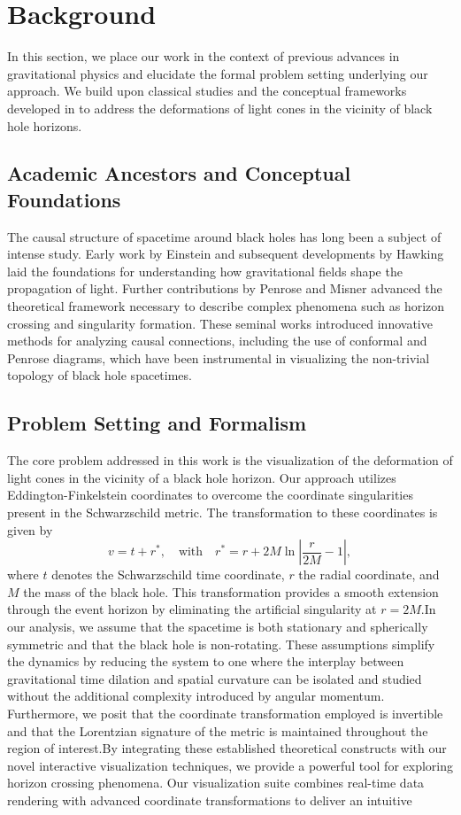 \documentclass{article}
\begin{document}
\section{Background}In this section, we place our work in the context of previous advances in gravitational physics and elucidate the formal problem setting underlying our approach. We build upon classical studies and the conceptual frameworks developed in \cite{Einstein1916, Hawking1973, Penrose1965, Misner1973} to address the deformations of light cones in the vicinity of black hole horizons.\subsection{Academic Ancestors and Conceptual Foundations}The causal structure of spacetime around black holes has long been a subject of intense study. Early work by Einstein \cite{Einstein1916} and subsequent developments by Hawking \cite{Hawking1973} laid the foundations for understanding how gravitational fields shape the propagation of light. Further contributions by Penrose \cite{Penrose1965} and Misner \cite{Misner1973} advanced the theoretical framework necessary to describe complex phenomena such as horizon crossing and singularity formation. These seminal works introduced innovative methods for analyzing causal connections, including the use of conformal and Penrose diagrams, which have been instrumental in visualizing the non-trivial topology of black hole spacetimes.\subsection{Problem Setting and Formalism}The core problem addressed in this work is the visualization of the deformation of light cones in the vicinity of a black hole horizon. Our approach utilizes Eddington-Finkelstein coordinates to overcome the coordinate singularities present in the Schwarzschild metric. The transformation to these coordinates is given by\begin{equation}v = t + r^*, \quad \text{with} \quad r^* = r + 2M \ln\left|\frac{r}{2M} - 1\right|, \end{equation}where $t$ denotes the Schwarzschild time coordinate, $r$ the radial coordinate, and $M$ the mass of the black hole. This transformation provides a smooth extension through the event horizon by eliminating the artificial singularity at $r = 2M$.In our analysis, we assume that the spacetime is both stationary and spherically symmetric and that the black hole is non-rotating. These assumptions simplify the dynamics by reducing the system to one where the interplay between gravitational time dilation and spatial curvature can be isolated and studied without the additional complexity introduced by angular momentum. Furthermore, we posit that the coordinate transformation employed is invertible and that the Lorentzian signature of the metric is maintained throughout the region of interest.By integrating these established theoretical constructs with our novel interactive visualization techniques, we provide a powerful tool for exploring horizon crossing phenomena. Our visualization suite combines real-time data rendering with advanced coordinate transformations to deliver an intuitive 
\end{document}
